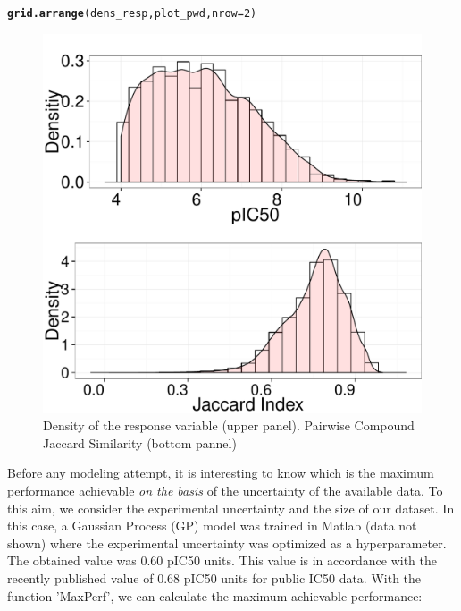 \documentclass[twoside,a4wide,12pt]{article}\usepackage[]{graphicx}\usepackage[]{color}
\makeatletter
\def\maxwidth{ %
  \ifdim\Gin@nat@width>\linewidth
    \linewidth
  \else
    \Gin@nat@width
  \fi
}
\newcommand{\hlnum}[1]{\textcolor[rgb]{0.686,0.059,0.569}{#1}}%
\newcommand{\hlstd}[1]{\textcolor[rgb]{0.345,0.345,0.345}{#1}}%
\newcommand{\hlkwc}[1]{\textcolor[rgb]{0.333,0.667,0.333}{#1}}%
\newcommand{\hlkwd}[1]{\textcolor[rgb]{0.737,0.353,0.396}{\textbf{#1}}}%
\newenvironment{kframe}{%
 \def\at@end@of@kframe{}%
 \ifinner\ifhmode%
  \def\at@end@of@kframe{\end{minipage}}%
  \begin{minipage}{\columnwidth}%
 \fi\fi%
 \def\FrameCommand##1{\hskip\@totalleftmargin \hskip-\fboxsep
 \colorbox{shadecolor}{##1}\hskip-\fboxsep
     \hskip-\linewidth \hskip-\@totalleftmargin \hskip\columnwidth}%
 \MakeFramed {\advance\hsize-\width
   \@totalleftmargin\z@ \linewidth\hsize
   \@setminipage}}%
 {\par\unskip\endMakeFramed%
 \at@end@of@kframe}
\newenvironment{knitrout}{}{} %
\makeatother
\begin{document}
\begin{knitrout}
\color{fgcolor}\begin{kframe}
\begin{alltt}
\hlkwd{grid.arrange}\hlstd{(dens_resp, plot_pwd,} \hlkwc{nrow} \hlstd{=} \hlnum{2}\hlstd{)}
\end{alltt}
\end{kframe}\begin{figure}[]


{\centering \includegraphics[width=\maxwidth]{figure/unnamed-chunk-26} 

}

\caption[Density of the response variable (upper panel)]{Density of the response variable (upper panel). Pairwise Compound Jaccard Similarity (bottom pannel)\label{fig:unnamed-chunk-26}}
\end{figure}


\end{knitrout}


Before any modeling attempt, it is interesting to know which is the maximum performance achievable {\it on the basis} of the uncertainty of the available data.\cite{cortesGP}
To this aim, we consider the experimental uncertainty and the size of our dataset. 
In this case, a Gaussian Process (GP) model was trained in Matlab (data not shown) where the experimental uncertainty was optimized as a hyperparameter. The obtained value was 0.60 pIC50 units.
This value is in accordance with the recently published value of 0.68 pIC50 units for public IC50 data.\cite{kramerIC50}
With the function 'MaxPerf', we can calculate the maximum achievable performance:
\end{document}
